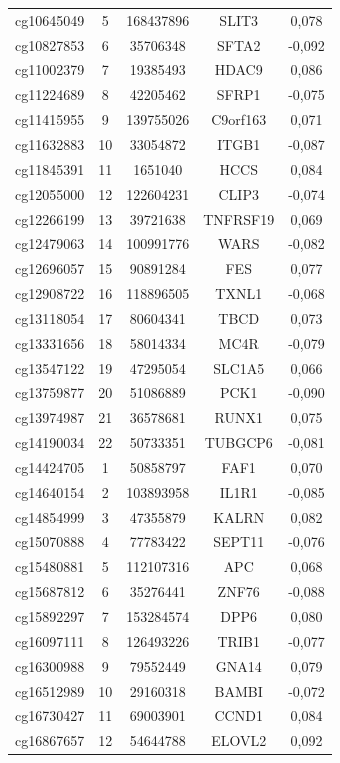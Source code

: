 \documentclass[12pt,a4paper]{article}
\begin{document}
\begin{longtable}{|c|c|c|c|c|}
		cg10645049 & 5 & 168437896 & SLIT3 & 0,078 \\
		cg10827853 & 6 & 35706348 & SFTA2 & -0,092 \\
		cg11002379 & 7 & 19385493 & HDAC9 & 0,086 \\
		cg11224689 & 8 & 42205462 & SFRP1 & -0,075 \\
		cg11415955 & 9 & 139755026 & C9orf163 & 0,071 \\
		cg11632883 & 10 & 33054872 & ITGB1 & -0,087 \\
		cg11845391 & 11 & 1651040 & HCCS & 0,084 \\
		cg12055000 & 12 & 122604231 & CLIP3 & -0,074 \\
		cg12266199 & 13 & 39721638 & TNFRSF19 & 0,069 \\
		cg12479063 & 14 & 100991776 & WARS & -0,082 \\
		cg12696057 & 15 & 90891284 & FES & 0,077 \\
		cg12908722 & 16 & 118896505 & TXNL1 & -0,068 \\
		cg13118054 & 17 & 80604341 & TBCD & 0,073 \\
		cg13331656 & 18 & 58014334 & MC4R & -0,079 \\
		cg13547122 & 19 & 47295054 & SLC1A5 & 0,066 \\
		cg13759877 & 20 & 51086889 & PCK1 & -0,090 \\
		cg13974987 & 21 & 36578681 & RUNX1 & 0,075 \\
		cg14190034 & 22 & 50733351 & TUBGCP6 & -0,081 \\
		cg14424705 & 1 & 50858797 & FAF1 & 0,070 \\
		cg14640154 & 2 & 103893958 & IL1R1 & -0,085 \\
		cg14854999 & 3 & 47355879 & KALRN & 0,082 \\
		cg15070888 & 4 & 77783422 & SEPT11 & -0,076 \\
		cg15480881 & 5 & 112107316 & APC & 0,068 \\
		cg15687812 & 6 & 35276441 & ZNF76 & -0,088 \\
		cg15892297 & 7 & 153284574 & DPP6 & 0,080 \\
		cg16097111 & 8 & 126493226 & TRIB1 & -0,077 \\
		cg16300988 & 9 & 79552449 & GNA14 & 0,079 \\
		cg16512989 & 10 & 29160318 & BAMBI & -0,072 \\
		cg16730427 & 11 & 69003901 & CCND1 & 0,084 \\
		cg16867657 & 12 & 54644788 & ELOVL2 & 0,092 \\

\end{longtable}
\end{document}
